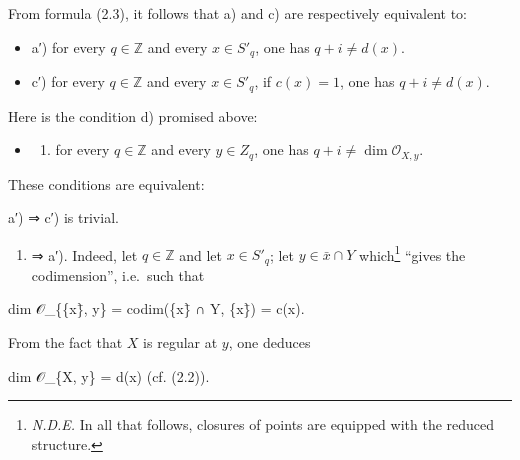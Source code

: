 \documentclass[
]{article}
\newenvironment{Shaded}{}{}
\newcommand{\NormalTok}[1]{#1}
\providecommand{\tightlist}{%
  \setlength{\itemsep}{0pt}\setlength{\parskip}{0pt}}
\begin{document}
From formula (2.3), it follows that a) and c) are respectively
equivalent to:

\begin{itemize}
\tightlist
\item
  a′) for every \(q \in \mathbb{Z}\) and every \(x \in S'_{q}\), one has
  \(q + i \neq d(x)\).
\item
  c′) for every \(q \in \mathbb{Z}\) and every \(x \in S'_{q}\), if
  \(c(x) = 1\), one has \(q + i \neq d(x)\).
\end{itemize}

Here is the condition d) promised above:

\begin{itemize}
\tightlist
\item
  \begin{enumerate}
  \def\labelenumi{\alph{enumi})}
  \setcounter{enumi}{3}
  \tightlist
  \item
    for every \(q \in \mathbb{Z}\) and every \(y \in Z_{q}\), one has
    \(q + i \neq \dim \mathcal{O}_{X,y}\).
  \end{enumerate}
\end{itemize}

These conditions are equivalent:

a′) ⇒ c′) is trivial.

\begin{enumerate}
\def\labelenumi{\alph{enumi})}
\setcounter{enumi}{3}
\tightlist
\item
  ⇒ a′). Indeed, let \(q \in \mathbb{Z}\) and let \(x \in S'_{q}\); let
  \(y \in \bar{x} \cap Y\) which\footnote{\emph{N.D.E.} In all that
    follows, closures of points are equipped with the reduced structure.}
  ``gives the codimension'', i.e.~such that
\end{enumerate}

\begin{Shaded}
\begin{Highlighting}[]
\NormalTok{dim 𝒪\_\{\{x\}̄, y\} = codim(\{x\}̄ ∩ Y, \{x\}̄) = c(x).}
\end{Highlighting}
\end{Shaded}

From the fact that \(X\) is regular at \(y\), one deduces

\begin{Shaded}
\begin{Highlighting}[]
\NormalTok{dim 𝒪\_\{X, y\} = d(x)    (cf. (2.2)).}
\end{Highlighting}
\end{Shaded}
\end{document}
